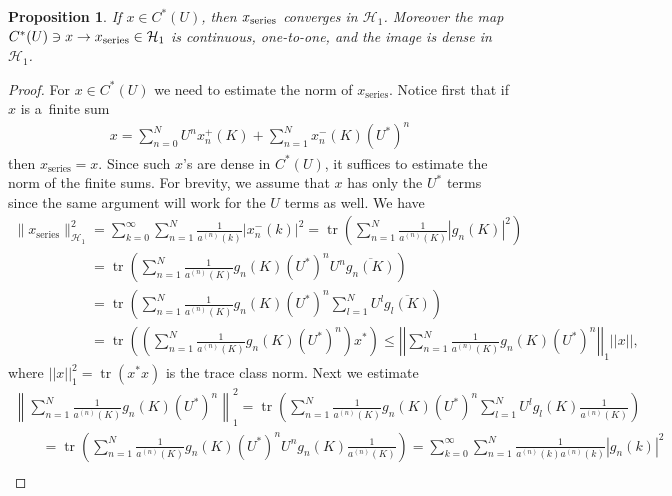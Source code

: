 \documentclass[pdftex]{sigma}
\numberwithin{equation}{section}
\newtheorem{prop}[theo]{Proposition}
{\theoremstyle{definition}
\newtheorem{rem}[theo]{Remark}
\newtheorem{defin}[theo]{Definition}
}
\DeclareMathOperator{\tr}{tr}
\begin{document}
\begin{prop}%
If $x\in C^*(U)$, then $x_{\rm series}$ converges in $\mathcal{H}_1$.
Moreover the map $C^*(U)\ni x\to x_{\rm series}\in \mathcal{H}_1$ is continuous, one-to-one, and the image is dense
in $\mathcal{H}_1$.
\end{prop}

\begin{proof}
For $x\in C^*(U)$ we need to estimate the norm of $x_\textrm{series}$.
Notice f\/irst that if $x$ is a~f\/inite sum
\begin{gather*}
x = \sum\limits_{n=0}^N U^n x_n^+(K) + \sum\limits_{n=1}^N x_n^-(K)(U^*)^n
\end{gather*}
then $x_{\textrm{series}} = x$.
Since such $x$'s are dense in $C^*(U)$, it suf\/f\/ices to estimate the norm of the f\/inite sums.
For brevity, we assume that $x$ has only the $U^*$ terms since the same argument will work for the $U$ terms as well.
We have
\begin{gather*}
\|x_{\textrm{series}}\|_{\mathcal{H}_1}^2 = \sum\limits_{k=0}^\infty \sum\limits_{n=1}^N
\frac{1}{a^{(n)}(k)}|x_n^-(k)|^2 = \tr\left(\sum\limits_{n=1}^N \frac{1}{a^{(n)}(K)}|g_n(K)|^2\right)
\\
\phantom{\|x_{\textrm{series}}\|_{\mathcal{H}_1}^2}
= \tr\left(\sum\limits_{n=1}^N \frac{1}{a^{(n)}(K)}g_n(K)\left(U^*\right)^nU^n\overline{g_n(K)}\right)
\\
\phantom{\|x_{\textrm{series}}\|_{\mathcal{H}_1}^2}
=\tr\left(\sum\limits_{n=1}^N \frac{1}{a^{(n)}(K)}g_n(K)\left(U^*\right)^n\sum\limits_{l=1}^NU^l\overline{g_l(K)}\right)
\\
\phantom{\|x_{\textrm{series}}\|_{\mathcal{H}_1}^2}
=\tr\left(\left(\sum\limits_{n=1}^N \frac{1}{a^{(n)}(K)}g_n(K)(U^*)^n\right)x^*\right)\leq
\left|\left|\sum\limits_{n=1}^N \frac{1}{a^{(n)}(K)}g_n(K)(U^*)^n\right|\right|_1||x||,
\end{gather*}
where $||x||^2_1=\tr(x^*x)$ is the trace class norm.
Next we estimate
\begin{gather*}
\left\|\sum\limits_{n=1}^N \frac{1}{a^{(n)}(K)}g_n(K)\left(U^*\right)^n\right\|_1^2 =
\tr\left(\sum\limits_{n=1}^N\frac{1}{a^{(n)}(K)}g_n(K)\left(U^*\right)^n\sum\limits_{l=1}^N
U^lg_l(K)\frac{1}{a^{(n)}(K)}\right)
\\
\qquad
=\tr\left(\sum\limits_{n=1}^N\frac{1}{a^{(n)}(K)}g_n(K)\left(U^*\right)^nU^n g_n(K)\frac{1}{a^{(n)}(K)}\right)
= \sum\limits_{k=0}^\infty \sum\limits_{n=1}^N \frac{1}{a^{(n)}(k)a^{(n)}(k)}|g_n(k)|^2
\\

\end{gather*}
\end{proof}
\end{document}

